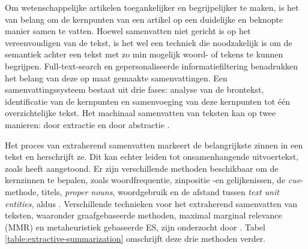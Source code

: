 \medspace

Om wetenschappelijke artikelen toegankelijker en begrijpelijker te maken, is het van belang om de kernpunten van een artikel op een duidelijke en beknopte manier samen te vatten. Hoewel samenvatten niet gericht is op het vereenvoudigen van de tekst, is het wel een techniek die noodzakelijk is om de semantiek achter een tekst met zo min mogelijk woord- of tekens te kunnen begrijpen. Full-text-search en gepersonaliseerde informatiefiltering benadrukken het belang van deze op maat gemaakte samenvattingen. Een samenvattingssysteem bestaat uit drie fases: analyse van de brontekst, identificatie van de kernpunten en samenvoeging van deze kernpunten tot één overzichtelijke tekst. Het machinaal samenvatten van teksten kan op twee manieren: door extractie en door abstractie \autocite{Hahn2000, Dubay2004}.

\medspace

Het proces van extraherend samenvatten markeert de belangrijkste zinnen in een tekst en herschrijft ze. Dit kan echter leiden tot onsamenhangende uitvoertekst, zoals \textcite{Khan2014} heeft aangetoond. Er zijn verschillende methoden beschikbaar om de kernzinnen te bepalen, zoals woordfrequentie, zinpositie -en gelijkenissen, de \textit{cue}-methode, titels, \textit{proper nouns}, woordgebruik en de afstand tussen \textit{text unit entities}, aldus \textcite{Khan2014}. Verschillende technieken voor het extraherend samenvatten van teksten, waaronder graafgebaseerde methoden, maximal marginal relevance (MMR) en metaheuristiek gebaseerde ES, zijn onderzocht door \textcite{Verma2020}. Tabel \ref{table:extractive-summarization} omschrijft deze drie methoden verder.

